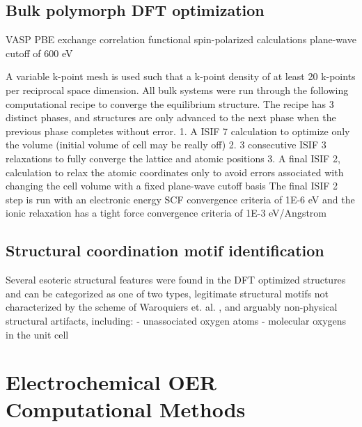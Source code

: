 \subsection{Bulk polymorph DFT optimization}
VASP
PBE exchange correlation functional
spin-polarized calculations
plane-wave cutoff of 600 eV

A variable k-point mesh is used such that a k-point density of at least 20 k-points per reciprocal space dimension.
%
All bulk systems were run through the following computational recipe to converge the equilibrium structure.
%
The recipe has 3 distinct phases, and structures are only advanced to the next phase when the previous phase completes without error.
%
1. A ISIF 7 calculation to optimize only the volume (initial volume of cell may be really off)
%
2. 3 consecutive ISIF 3 relaxations to fully converge the lattice and atomic positions
%
3. A final ISIF 2, calculation to relax the atomic coordinates only to avoid errors associated with changing the cell volume with a fixed plane-wave cutoff basis
%
The final ISIF 2 step is run with an electronic energy SCF convergence criteria of 1E-6 eV and the ionic relaxation has a tight force convergence criteria of 1E-3 eV/Angstrom

\subsection{Structural coordination motif identification}
Several esoteric structural features were found in the DFT optimized structures and can be categorized as one of two types, legitimate structural motifs not characterized by the scheme of Waroquiers et. al. \cite{Waroquiers2017}, and arguably non-physical structural artifacts, including:
- unassociated oxygen atoms
- molecular oxygens in the unit cell
%



\section{Electrochemical OER Computational Methods}  %
%

